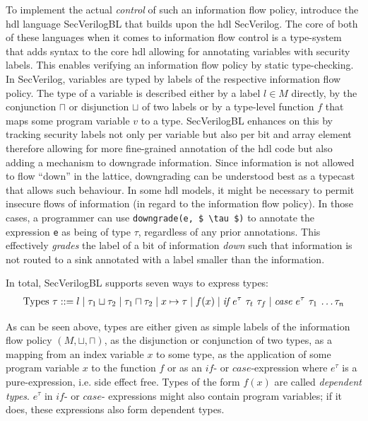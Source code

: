 To implement the actual \textit{control} of such an information flow policy, \citeauthor{Ferraiuolo17} introduce the \gls{hdl} language SecVerilogBL that builds upon the \gls{hdl} SecVerilog.
The core of both of these languages when it comes to information flow control is a type-system that adds syntax to the core \gls{hdl} allowing for annotating variables with security labels.
This enables verifying an information flow policy by static type-checking.
In SecVerilog, variables are typed by labels of the respective information flow policy.
The type of a variable is described either by a label $ l \in M $ directly, by the conjunction $ \sqcap $ or disjunction $ \sqcup $ of two labels or by a type-level function $ f $ that maps some program variable $ v $ to a type.
SecVerilogBL enhances on this by tracking security labels not only per variable but also per bit and array element therefore allowing for more fine-grained annotation of the \gls{hdl} code but also adding a mechanism to downgrade information.
Since information is not allowed to flow \enquote{down} in the lattice, downgrading can be understood best as a typecast that allows such behaviour.
In some \gls{hdl} models, it might be necessary to permit insecure flows of information (in regard to the information flow policy).
In those cases, a programmer can use \lstinline[mathescape]{downgrade(e, $ \tau $)} to annotate the expression \lstinline{e} as being of type $ \tau $, regardless of any prior annotations.
This effectively \textit{grades} the label of a bit of information \textit{down} such that information is not routed to a sink annotated with a label smaller than the information.

In total, SecVerilogBL supports seven ways to express types:
\begin{align*}
    \text{Types } \tau ::= l \mid \tau_1 \sqcup \tau_2 \mid \tau_1 \sqcap \tau_2 \mid x \mapsto \tau \mid f(x) \mid \textit{if $ e^\tau $ $ \tau_t $ $ \tau_f $} \mid \textit{case $ e^\tau $ $ \tau_1 $ \dots $ \tau_n $}
\end{align*}

As can be seen above, types are either given as simple labels of the information flow policy $ (M, \sqcup, \sqcap) $, as the disjunction or conjunction of two types, as a mapping from an index variable $ x $ to some type, as the application of some program variable $ x $ to the function $ f $ or as an $ \textit{if} $- or $ \textit{case} $-expression where $ e^\tau $ is a pure-expression, i.e. side effect free.
Types of the form $ f(x) $ are called \textit{dependent types}.
$ e^\tau $ in $ \textit{if} $- or $ \textit{case} $- expressions might also contain program variables; if it does, these expressions also form dependent types.

